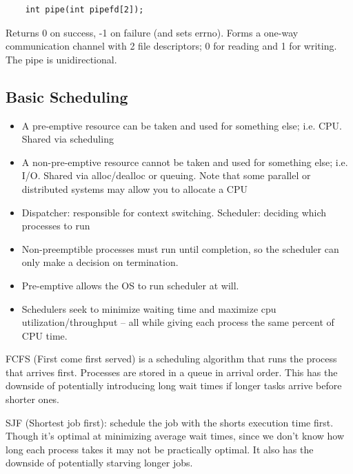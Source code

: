 \documentclass[../notes.tex]{subfiles}
\begin{document}
\begin{definition}
    \begin{listing}[H]
    \begin{verbatim}
    int pipe(int pipefd[2]);
    \end{verbatim}
    \end{listing}

    Returns 0 on success, -1 on failure (and sets errno). Forms a one-way communication channel with 2 file descriptors; 0 for reading and 1 for writing. The pipe is unidirectional.

\end{definition}

\subsection{Basic Scheduling}

\begin{itemize}
    \item A pre-emptive resource can be taken and used for something else; i.e. CPU. Shared via scheduling
    \item A non-pre-emptive resource cannot be taken and used for something else; i.e. I/O. Shared via alloc/dealloc or queuing. Note that some parallel or distributed systems may allow you to allocate a CPU
    \item Dispatcher: responsible for context switching. Scheduler: deciding which processes to run
    \item Non-preemptible processes must run until completion, so the scheduler can only make a decision on termination.
    \item Pre-emptive allows the OS to run scheduler at will.
    \item Schedulers seek to minimize waiting time and maximize cpu utilization/throughput -- all while giving each process the same percent of CPU time.
\end{itemize}


\begin{definition}
    FCFS (First come first served) is a scheduling algorithm  that runs the process that arrives first. Processes are stored in a queue in arrival order. This has the downside of potentially introducing long wait times if longer tasks arrive before shorter ones.
\end{definition}

\begin{definition}
    SJF (Shortest job first): schedule the job with the shorts execution time first. Though it's optimal at minimizing average wait times, since we don't know how long each process takes it may not be practically optimal. It also has the downside of potentially starving longer jobs.
\end{definition}
\end{document}
